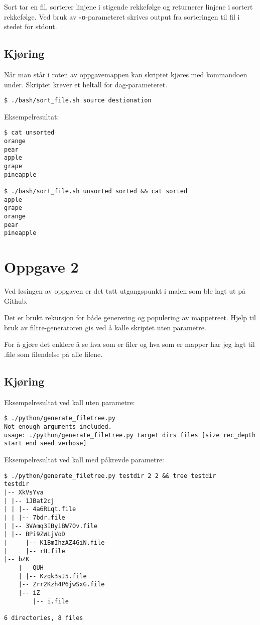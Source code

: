 \documentclass{article}
\begin{document}
Sort tar en fil, sorterer linjene i stigende rekkefølge og returnerer linjene i sortert rekkefølge. Ved bruk av \textbf{-o}-parameteret skrives output fra sorteringen til fil i stedet for stdout.

\subsection*{Kjøring}
Når man står i roten av oppgavemappen kan skriptet kjøres med kommandoen under. Skriptet krever et heltall for dag-parameteret.
\begin{Verbatim}[fontsize=\small, frame=single]
$ ./bash/sort_file.sh source destionation
\end{Verbatim}

Eksempelresultat:
\begin{Verbatim}[fontsize=\small, frame=single]
$ cat unsorted
orange
pear
apple
grape
pineapple

$ ./bash/sort_file.sh unsorted sorted && cat sorted
apple
grape
orange
pear
pineapple
\end{Verbatim}

\section*{Oppgave 2}

Ved løsingen av oppgaven er det tatt utgangspunkt i malen som ble lagt ut på Github.

Det er brukt rekursjon for både generering og populering av mappetreet. Hjelp til bruk av filtre-generatoren gis ved å kalle skriptet uten parametre.

For å gjøre det enklere å se hva som er filer og hva som er mapper har jeg lagt til .file som filendelse på alle filene.

\subsection*{Kjøring}
Eksempelresultat ved kall uten parametre:
\begin{Verbatim}[fontsize=\small, frame=single]
$ ./python/generate_filetree.py
Not enough arguments included.
usage: ./python/generate_filetree.py target dirs files [size rec_depth
start end seed verbose]
\end{Verbatim}

Eksempelresultat ved kall med påkrevde parametre:
\begin{Verbatim}[fontsize=\small, frame=single]
$ ./python/generate_filetree.py testdir 2 2 && tree testdir
testdir
|-- XkVsYva
| |-- 1JBat2cj
| | |-- 4a6RLqt.file
| | |-- 7bdr.file
| |-- 3VAmq3IByiBW7Ov.file
| |-- BPi9ZWLjVoD
|     |-- K1BmIhzAZ4GiN.file
|     |-- rH.file
|-- bZK
    |-- QUH
    | |-- Kzqk3sJ5.file
    |-- Zrr2Kzh4P6jwSxG.file
    |-- iZ
        |-- i.file

6 directories, 8 files
\end{Verbatim}
\end{document}
